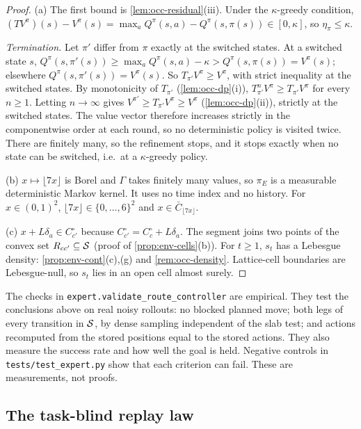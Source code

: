 \begin{proof}
(a) The first bound is \cref{lem:occ-residual}(iii). Under the $\kappa$-greedy condition, $(TV^\pi)(s)-V^\pi(s)=\max_aQ^\pi(s,a)-Q^\pi(s,\pi(s))\in[0,\kappa]$, so $\eta_\pi\le\kappa$.

\emph{Termination.} Let $\pi'$ differ from $\pi$ exactly at the switched states.
At a switched state $s$, $Q^\pi(s,\pi'(s))\ge\max_aQ^\pi(s,a)-\kappa>Q^\pi(s,\pi(s))=V^\pi(s)$; elsewhere $Q^\pi(s,\pi'(s))=V^\pi(s)$.
So $T_{\pi'}V^\pi\ge V^\pi$, with strict inequality at the switched states.
By monotonicity of $T_{\pi'}$ (\cref{lem:occ-dp}(i)), $T_{\pi'}^nV^\pi\ge T_{\pi'}V^\pi$ for every $n\ge1$. Letting $n\to\infty$ gives $V^{\pi'}\ge T_{\pi'}V^\pi\ge V^\pi$ (\cref{lem:occ-dp}(ii)), strictly at the switched states.
The value vector therefore increases strictly in the componentwise order at each round, so no deterministic policy is visited twice. There are finitely many, so the refinement stops, and it stops exactly when no state can be switched, i.e.\ at a $\kappa$-greedy policy.

(b) $x\mapsto\lfloor7x\rfloor$ is Borel and $\Gamma$ takes finitely many values, so $\pi_E$ is a measurable deterministic Markov kernel. It uses no time index and no history.
For $x\in(0,1)^2$, $\lfloor7x\rfloor\in\{0,\dots,6\}^2$ and $x\in\bar C_{\lfloor7x\rfloor}$.

(c) $x+L\delta_a\in C^\circ_{c'}$ because $C^\circ_{c'}=C^\circ_c+L\delta_a$. The segment joins two points of the convex set $R_{cc'}\subseteq\mathcal{S}$ (proof of \cref{prop:env-cells}(b)).
For $t\ge1$, $s_t$ has a Lebesgue density: \cref{prop:env-cont}(c),(g) and \cref{rem:occ-density}. Lattice-cell boundaries are Lebesgue-null, so $s_t$ lies in an open cell almost surely.
\end{proof}

\noindent The checks in \texttt{expert.validate\_route\_controller} are empirical. They test the conclusions above on real noisy rollouts: no blocked planned move; both legs of every transition in $\mathcal{S}$, by dense sampling independent of the slab test; and actions recomputed from the stored positions equal to the stored actions. They also measure the success rate and how well the goal is held.
Negative controls in \texttt{tests/test\_expert.py} show that each criterion can fail.
These are measurements, not proofs.

\subsection{The task-blind replay law}\label{sec:env-replay}

